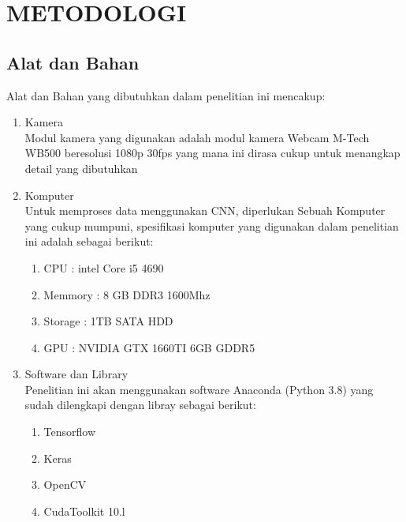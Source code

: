 \documentclass[a4paper]{article}
\begin{document}
	\newpage
	\section{METODOLOGI}
		\subsection{Alat dan Bahan}
			Alat dan Bahan yang dibutuhkan dalam penelitian ini mencakup:
			\begin{enumerate}
				\item Kamera\\
				Modul kamera yang digunakan adalah modul kamera Webcam M-Tech WB500 beresolusi 1080p 30fps yang mana ini dirasa cukup untuk menangkap detail yang dibutuhkan
				\item Komputer\\
				Untuk memproses data menggunakan CNN, diperlukan Sebuah Komputer yang cukup mumpuni, spesifikasi komputer yang digunakan dalam penelitian ini adalah sebagai berikut:
				\begin{enumerate}
					\item CPU   : intel Core i5 4690
					\item Memmory   : 8 GB DDR3 1600Mhz
					\item Storage   : 1TB SATA HDD
					\item GPU   : NVIDIA GTX 1660TI 6GB GDDR5
				\end{enumerate}
				\item Software dan Library\\
				Penelitian ini akan menggunakan software Anaconda (Python 3.8) yang sudah dilengkapi dengan libray sebagai berikut:
				\begin{enumerate}
					\item Tensorflow
					\item Keras
					\item OpenCV
					\item CudaToolkit 10.l
				\end{enumerate}
			\end{enumerate}
\end{document}
